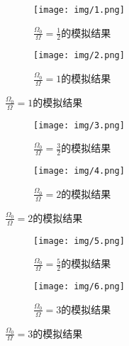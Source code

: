 \begin{figure}[H]
\begin{minipage}[t]{.5\textwidth}
\begin{figure}[H]
    \centering
    \texttt{[image: img/1.png]}
    \caption{$\frac{\Omega_{0}}{\Omega}=\frac{1}{2}$的模拟结果}
\end{figure}
\end{minipage}
\begin{minipage}[t]{.5\textwidth}
\begin{figure}[H]
    \centering
    \centering
    \texttt{[image: img/2.png]}
    \caption{$\frac{\Omega_{0}}{\Omega}=1$的模拟结果}
\end{figure}
\end{minipage}
\end{figure}
\begin{figure}[H]
\begin{minipage}[t]{.5\textwidth}
\begin{figure}[H]
    \centering
    \texttt{[image: img/3.png]}
    \caption{$\frac{\Omega_{0}}{\Omega}=\frac{3}{2}$的模拟结果}
\end{figure}
\end{minipage}
\begin{minipage}[t]{.5\textwidth}
\begin{figure}[H]
    \centering
    \centering
    \texttt{[image: img/4.png]}
    \caption{$\frac{\Omega_{0}}{\Omega}=2$的模拟结果}
\end{figure}
\end{minipage}
\end{figure}
\begin{figure}[H]
\begin{minipage}[t]{.5\textwidth}
\begin{figure}[H]
    \centering
    \texttt{[image: img/5.png]}
    \caption{$\frac{\Omega_{0}}{\Omega}=\frac{5}{2}$的模拟结果}
\end{figure}
\end{minipage}
\begin{minipage}[t]{.5\textwidth}
\begin{figure}[H]
    \centering
    \centering
    \texttt{[image: img/6.png]}
    \caption{$\frac{\Omega_{0}}{\Omega}=3$的模拟结果}
\end{figure}
\end{minipage}
\end{figure}

